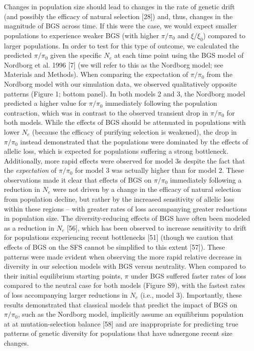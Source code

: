 \documentclass[9pt,twocolumn,twoside]{rilabRxiv}
\begin{document}
Changes in population size should lead to changes in the rate of genetic
drift (and possibly the efficacy of natural selection [28]) and,
thus, changes in the magnitude of BGS across time. If this were the
case, we would expect smaller populations to experience weaker BGS (with
higher $\pi/\pi_0$ and $\xi/\xi_0$) compared to larger
populations. In order to test for this type of outcome, we calculated
the predicted $\pi/\pi_0$ given the specific
$N_e$ at each time point using the BGS model of
Nordborg et al. 1996 [7] (we will refer to this as the Nordborg
model; see Materials and Methods). When comparing the expectation of
$\pi/\pi_0$ from the Nordborg model with our simulation data,
we observed qualitatively opposite patterns (Figure 1; bottom panel). In
both models 2 and 3, the Nordborg model predicted a higher value for
$\pi/\pi_0$ immediately following the population contraction,
which was in contrast to the observed transient drop in
$\pi/\pi_0$ for both models. While the effects of BGS should be
attenuated in populations with lower $N_e$ (because
the efficacy of purifying selection is weakened), the
drop in $\pi/\pi_0$ instead demonstrated that the populations
were dominated by the effects of allelic loss, which is expected for
populations suffering a strong bottleneck. Additionally, more rapid
effects were observed for model 3s despite the fact that the
\emph{expectation} of $\pi/\pi_0$ for model 3 was actually
higher than for model 2. These observations made it clear that effects
of BGS on $\pi/\pi_0$ immediately following a reduction in
$N_e$ were not driven by a change in the efficacy of
natural selection from population decline, but rather by the increased
sensitivity of allelic loss within these regions -- with greater rates
of loss accompanying greater reductions in population size. The
diversity-reducing effects of BGS have often been modeled as a reduction
in $N_e$ [56], which has been observed to
increase sensitivity to drift for populations
experiencing recent bottlenecks [51] (though we caution that effects
of BGS on the SFS cannot be simplified to this extent [57]). These
patterns were made evident when observing the more rapid relative
decrease in diversity in our selection models with BGS versus
neutrality. When compared to their initial equilibrium starting points,
$\pi$ under BGS suffered faster rates of loss compared to the neutral case
for both models (Figure S9), with the fastest rates of loss accompanying
larger reductions in $N_e$ (i.e., model 3).
Importantly, these results demonstrated that classical models that
predict the impact of BGS on $\pi/\pi_0$, such as the Nordborg
model, implicitly assume an equilibrium population at at
mutation-selection balance [58] and are inappropriate for predicting
true patterns of genetic diversity for populations that have udnergone
recent size changes.
\end{document}
